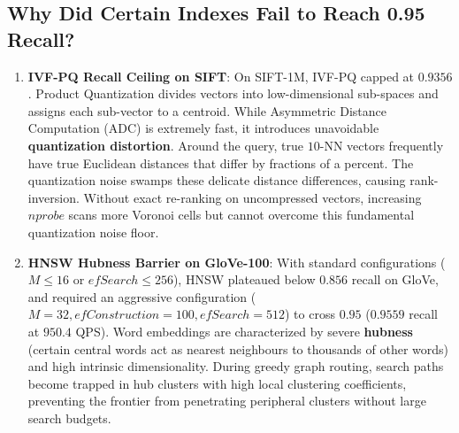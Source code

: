 \documentclass[10pt,twocolumn,a4paper]{article}
\begin{document}
\begin{table}[H]
\centering
\small
\caption{Build Time and Memory at Recall $\ge 0.95$}
\label{tab:cost_table}
\end{table}

\subsection{Why Did Certain Indexes Fail to Reach 0.95 Recall?}
\begin{enumerate}
    \item \textbf{IVF-PQ Recall Ceiling on SIFT}: On SIFT-1M, IVF-PQ capped at $0.9356$. Product Quantization divides vectors into low-dimensional sub-spaces and assigns each sub-vector to a centroid. While Asymmetric Distance Computation (ADC) is extremely fast, it introduces unavoidable \textbf{quantization distortion}. Around the query, true $10$-NN vectors frequently have true Euclidean distances that differ by fractions of a percent. The quantization noise swamps these delicate distance differences, causing rank-inversion. Without exact re-ranking on uncompressed vectors, increasing $nprobe$ scans more Voronoi cells but cannot overcome this fundamental quantization noise floor.
    \item \textbf{HNSW Hubness Barrier on GloVe-100}: With standard configurations ($M \le 16$ or $efSearch \le 256$), HNSW plateaued below $0.856$ recall on GloVe, and required an aggressive configuration ($M=32, efConstruction=100, efSearch=512$) to cross $0.95$ ($0.9559$ recall at $950.4$ QPS). Word embeddings are characterized by severe \textbf{hubness} (certain central words act as nearest neighbours to thousands of other words) and high intrinsic dimensionality. During greedy graph routing, search paths become trapped in hub clusters with high local clustering coefficients, preventing the frontier from penetrating peripheral clusters without large search budgets.
\end{enumerate}
\end{document}
